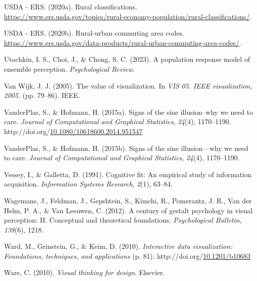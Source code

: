\documentclass[print]{nuthesis}
\newlength{\cslhangindent}
\newenvironment{CSLReferences}[2]%
{\setlength{\parindent}{0pt}%
\everypar{\setlength{\hangindent}{\cslhangindent}}\ignorespaces}%
{\par}
\begin{document}
\begin{CSLReferences}{1}{0}
\leavevmode{}%
USDA - ERS. (2020a). Rural classifications. \url{https://www.ers.usda.gov/topics/rural-economy-population/rural-classifications/}.

\leavevmode{}%
USDA - ERS. (2020b). Rural-urban commuting area codes. \url{https://www.ers.usda.gov/data-products/rural-urban-commuting-area-codes/}.

\leavevmode{}%
Utochkin, I. S., Choi, J., \& Chong, S. C. (2023). A population response model of ensemble perception. \emph{Psychological Review}.

\leavevmode{}%
Van Wijk, J. J. (2005). The value of visualization. In \emph{VIS 05. IEEE visualization, 2005.} (pp. 79--86). IEEE.

\leavevmode{}%
VanderPlas, S., \& Hofmann, H. (2015a). Signs of the sine illusion--why we need to care. \emph{Journal of Computational and Graphical Statistics}, \emph{24}(4), 1170--1190. http://doi.org/\href{https://doi.org/10.1080/10618600.2014.951547}{10.1080/10618600.2014.951547}

\leavevmode{}%
VanderPlas, S., \& Hofmann, H. (2015b). Signs of the sine illusion---why we need to care. \emph{Journal of Computational and Graphical Statistics}, \emph{24}(4), 1170--1190.

\leavevmode{}%
Vessey, I., \& Galletta, D. (1991). Cognitive fit: An empirical study of information acquisition. \emph{Information Systems Research}, \emph{2}(1), 63--84.

\leavevmode{}%
Wagemans, J., Feldman, J., Gepshtein, S., Kimchi, R., Pomerantz, J. R., Van der Helm, P. A., \& Van Leeuwen, C. (2012). A century of gestalt psychology in visual perception: II. Conceptual and theoretical foundations. \emph{Psychological Bulletin}, \emph{138}(6), 1218.

\leavevmode{}%
Ward, M., Grinstein, G., \& Keim, D. (2010). \emph{Interactive data visualization: Foundations, techniques, and applications} (p. 81). http://doi.org/\href{https://doi.org/10.1201/b10683}{10.1201/b10683}

\leavevmode{}%
Ware, C. (2010). \emph{Visual thinking for design}. Elsevier.


\end{CSLReferences}
\end{document}
